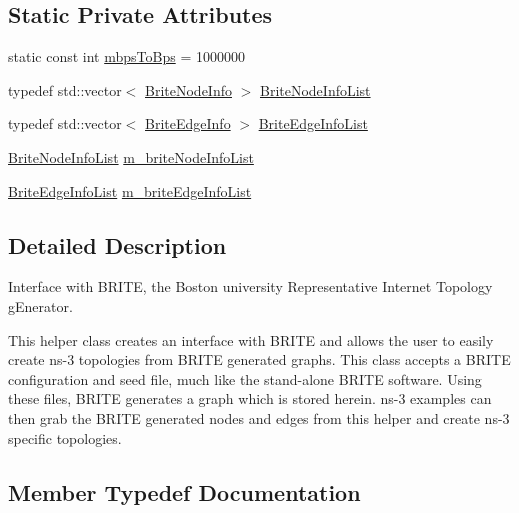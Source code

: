 \subsection*{Static Private Attributes}
\begin{DoxyCompactItemize}
\item 
static const int \hyperlink{classns3_1_1BriteTopologyHelper_a5fa33bdac6a048d6b66704bb846e0369}{mbps\+To\+Bps} = 1000000
\end{DoxyCompactItemize}
\begin{DoxyCompactItemize}
\item 
typedef std\+::vector$<$ \hyperlink{structns3_1_1BriteTopologyHelper_1_1BriteNodeInfo}{Brite\+Node\+Info} $>$ \hyperlink{classns3_1_1BriteTopologyHelper_a92cab5d8859b5f4682b8aff38a6959c7}{Brite\+Node\+Info\+List}
\item 
typedef std\+::vector$<$ \hyperlink{structns3_1_1BriteTopologyHelper_1_1BriteEdgeInfo}{Brite\+Edge\+Info} $>$ \hyperlink{classns3_1_1BriteTopologyHelper_aa5320918091f27883e0d106f00c5b8ef}{Brite\+Edge\+Info\+List}
\item 
\hyperlink{classns3_1_1BriteTopologyHelper_a92cab5d8859b5f4682b8aff38a6959c7}{Brite\+Node\+Info\+List} \hyperlink{classns3_1_1BriteTopologyHelper_a00cc88fa8dcff8bc01878dabb3226fbe}{m\+\_\+brite\+Node\+Info\+List}
\item 
\hyperlink{classns3_1_1BriteTopologyHelper_aa5320918091f27883e0d106f00c5b8ef}{Brite\+Edge\+Info\+List} \hyperlink{classns3_1_1BriteTopologyHelper_a04162f6e488c14c715879c4fc495a88a}{m\+\_\+brite\+Edge\+Info\+List}
\end{DoxyCompactItemize}


\subsection{Detailed Description}
Interface with B\+R\+I\+TE, the Boston university Representative Internet Topology g\+Enerator. 

This helper class creates an interface with B\+R\+I\+TE and allows the user to easily create ns-\/3 topologies from B\+R\+I\+TE generated graphs. This class accepts a B\+R\+I\+TE configuration and seed file, much like the stand-\/alone B\+R\+I\+TE software. Using these files, B\+R\+I\+TE generates a graph which is stored herein. ns-\/3 examples can then grab the B\+R\+I\+TE generated nodes and edges from this helper and create ns-\/3 specific topologies. 

\subsection{Member Typedef Documentation}
